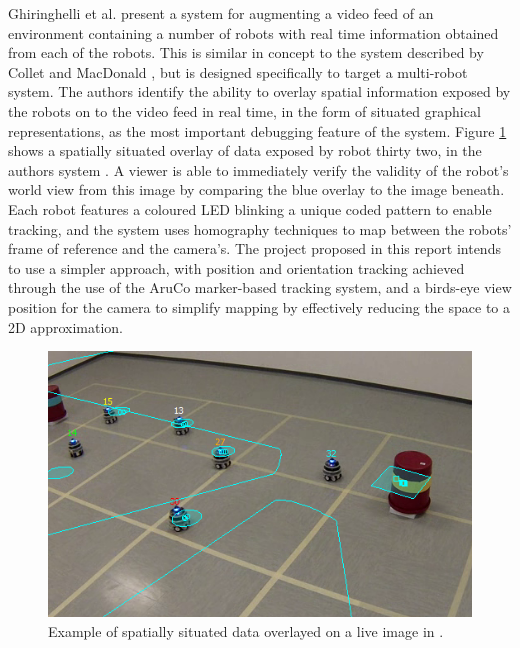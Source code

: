 \documentclass[hidelinks,10pt]{article}
\begin{document}
Ghiringhelli et al. \cite{LEDSwarmAR} present a system for augmenting a video feed of an environment containing a number of robots with real time information obtained from each of the robots. This is similar in concept to the system described by Collet and MacDonald \cite{AugmentedRealityDebuggingSystem}, but is designed specifically to target a multi-robot system. The authors identify the ability to overlay spatial information exposed by the robots on to the video feed in real time, in the form of situated graphical representations, as the most important debugging feature of the system. Figure \ref{fig:SpatiallySituated} shows a spatially situated overlay of data exposed by robot thirty two, in the authors system \cite{LEDSwarmAR}. A viewer is able to immediately verify the validity of the robot's world view from this image by comparing the blue overlay to the image beneath. Each robot features a coloured LED blinking a unique coded pattern to enable tracking, and the system uses homography techniques to map between the robots' frame of reference and the camera's. The project proposed in this report intends to use a simpler approach, with position and orientation tracking achieved through the use of the AruCo \cite{AruCo} marker-based tracking system, and a birds-eye view position for the camera to simplify mapping by effectively reducing the space to a 2D approximation.

\begin{figure}[H]
	\begin{center}
	\includegraphics[scale=0.8]{SpatiallySituatedData.png}
	\caption{Example of spatially situated data overlayed on a live image in \cite{LEDSwarmAR}.}
	\label{fig:SpatiallySituated}
	\end{center}
\end{figure}
\end{document}
